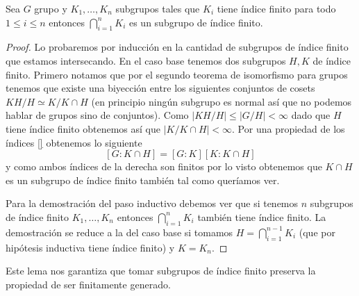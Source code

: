\documentclass[tesis.tex]{subfiles}
\begin{document}
\begin{lema}\label{lema_indice_interseccion}
	Sea $G$ grupo y $K_1, \dots, K_n$ subgrupos tales que $K_{i}$ tiene índice finito para todo $ 1 \le i \le n $ entonces $\bigcap_{i=1}^{n} K_{i}$ es un subgrupo de índice finito.
\end{lema}
\begin{proof}
	Lo probaremos por inducción en la cantidad de subgrupos de índice finito que estamos intersecando.
	En el caso base tenemos dos subgrupos $H,K$ de índice finito.
	Primero notamos que por el segundo teorema de isomorfismo para grupos tenemos que existe una biyección entre los siguientes conjuntos de cosets $ KH / H \simeq K / K \cap H $ (en principio ningún subgrupo es normal así que no podemos hablar de grupos sino de conjuntos).
	Como  $|KH / H| \le |G / H| < \infty$ dado que $H$ tiene índice finito obtenemos así que $|K / K \cap H| < \infty$.
	Por una propiedad de los índices \ref{} obtenemos lo siguiente
	\[
	[G:K\cap H] = [G:K][K: K \cap H]
	\]
	y como ambos índices de la derecha son finitos por lo visto obtenemos que $K \cap H$ es un subgrupo de índice finito también tal como queríamos ver.
	
	Para la demostración del paso inductivo debemos ver que si tenemos $n$ subgrupos de índice finito $K_{1}, \dots, K_{n}$ entonces $\bigcap_{i=1}^{n} K_{i}$ también tiene índice finito.
	La demostración se reduce a la del caso base si tomamos $H = \bigcap_{i=1}^{n-1} K_{i}$ (que por hipótesis inductiva tiene índice finito) y $K = K_{n}$.
\end{proof}

Este lema nos garantiza que tomar subgrupos de índice finito preserva la propiedad de ser finitamente generado.
\end{document}
